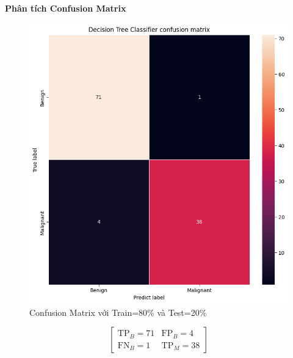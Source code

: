 \newpage
\textbf{Phân tích Confusion Matrix}
\begin{figure}[h!]
	\centering
	\begin{minipage}[b]{0.6\linewidth}
		\centering
		\includegraphics[width=\linewidth]{figures/dataset1/8020.png}
		\caption{Confusion Matrix với Train=80\% và Test=20\%}
		\label{fig:confusion_8020}
	\end{minipage}
\end{figure}

\[
\begin{bmatrix}
	\text{TP}_{B} = 71 & \text{FP}_{B} = 4 \\
	\text{FN}_{B} = 1   & \text{TP}_{M} = 38
\end{bmatrix}
\]

